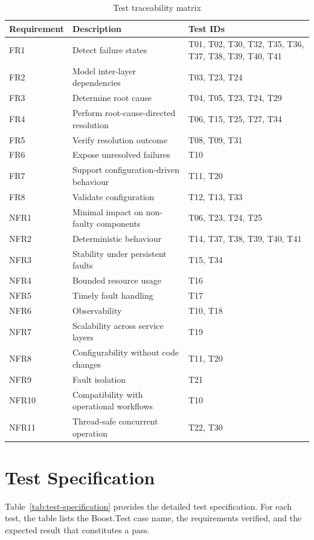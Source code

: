 \begin{table}[htbp]
\centering
\begin{tabular}{p{1.5cm} p{5cm} p{6cm}}
\hline
Requirement & Description & Test IDs \\
\hline
FR1 & Detect failure states & T01, T02, T30, T32, T35, T36, T37, T38, T39, T40, T41 \\
FR2 & Model inter-layer dependencies & T03, T23, T24 \\
FR3 & Determine root cause & T04, T05, T23, T24, T29 \\
FR4 & Perform root-cause-directed resolution & T06, T15, T25, T27, T34 \\
FR5 & Verify resolution outcome & T08, T09, T31 \\
FR6 & Expose unresolved failures & T10 \\
FR7 & Support configuration-driven behaviour & T11, T20 \\
FR8 & Validate configuration & T12, T13, T33 \\
NFR1 & Minimal impact on non-faulty components & T06, T23, T24, T25 \\
NFR2 & Deterministic behaviour & T14, T37, T38, T39, T40, T41 \\
NFR3 & Stability under persistent faults & T15, T34 \\
NFR4 & Bounded resource usage & T16 \\
NFR5 & Timely fault handling & T17 \\
NFR6 & Observability & T10, T18 \\
NFR7 & Scalability across service layers & T19 \\
NFR8 & Configurability without code changes & T11, T20 \\
NFR9 & Fault isolation & T21 \\
NFR10 & Compatibility with operational workflows & T10 \\
NFR11 & Thread-safe concurrent operation & T22, T30 \\
\hline
\end{tabular}
\caption{Test traceability matrix}
\label{tab:test-traceability-matrix}
\end{table}
\FloatBarrier
\section{Test Specification}\label{sec:test-specification}

Table~\ref{tab:test-specification} provides the detailed test specification. For each test, the table lists the Boost.Test case name, the requirements verified, and the expected result that constitutes a pass.

